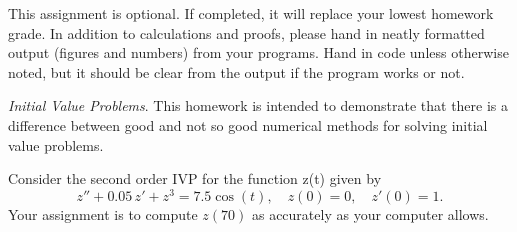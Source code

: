 \documentclass[12pt,fleqn]{exam}
\renewcommand*{\vec}[1]{\boldsymbol{#1}}
\begin{document}
\vspace{1ex} This assignment is optional. If completed, it will replace your lowest homework grade. In addition to calculations and proofs, please hand in neatly formatted output (figures and numbers) from your programs. Hand in code unless otherwise noted, but it should be clear from the output if the program works or not.

\begin{questions}

\question \emph{Initial Value Problems}. This homework is intended to demonstrate that there is a difference between good and not so good numerical methods for solving initial value problems.

Consider the second order IVP for the function z(t) given by
\[z'' + 0.05\,z' + z^3 = 7.5 \cos(t), \quad z(0) = 0,\quad z'(0) = 1.\]
Your assignment is to compute $z(70)$ as accurately as your computer allows.

\end{questions}
\end{document}
